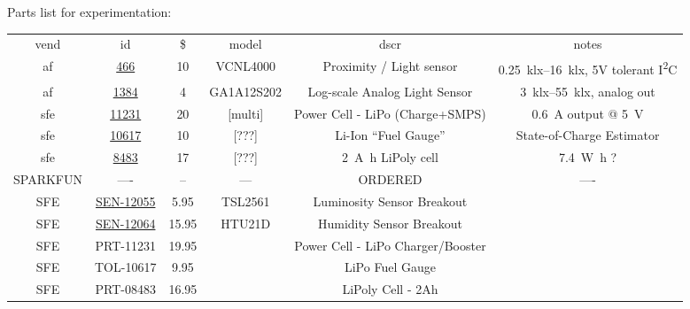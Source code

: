 \documentclass[12pt]{article} %
\begin{document}
Parts list for experimentation:
\\
\begin{tabu}{cccccc}
vend & id & \$ & model & dscr & notes
\\ af & \href{https://www.adafruit.com/products/466}{466}
    & 10 & VCNL4000 & Proximity / Light sensor
	& \SIrange{0.25}{16}{\kilo \lux},
	5V tolerant I\textsuperscript{2}C
\\ af & \href{https://www.adafruit.com/products/1384}{1384}
    & 4 & GA1A12S202 & Log-scale Analog Light Sensor
	& \SIrange{3}{55}{\kilo \lux}, 
	analog out
\\ sfe & \href{https://www.sparkfun.com/products/11231}{11231}
    & 20 & [multi] & Power Cell - LiPo (Charge+SMPS)
	& \SI{0.6}{\ampere} output @ \SI{5}{\volt}
\\ sfe & \href{https://www.sparkfun.com/products/10617}{10617}
    & 10 & [???] & Li-Ion ``Fuel Gauge'' 
	& State-of-Charge Estimator
\\ sfe & \href{https://www.sparkfun.com/products/8483}{8483}
    & 17 & [???] & \SI{2}{\ampere\hour} LiPoly cell
	& \SI{7.4}{\watt\hour} ?
\\ \hline SPARKFUN & ----
    & -- & --- & ORDERED
	& ----
\\ SFE & \href{https://www.sparkfun.com/products/12055}{SEN-12055}
	& 5.95 & TSL2561 & Luminosity Sensor Breakout &
\\ SFE & \href{https://www.sparkfun.com/products/12064}{SEN-12064}
	& 15.95 & HTU21D & Humidity Sensor Breakout &
\\ SFE & PRT-11231 
	& 19.95 && Power Cell - LiPo Charger/Booster &
\\ SFE & TOL-10617 
	& 9.95 && LiPo Fuel Gauge &
\\ SFE & PRT-08483 
	& 16.95 && LiPoly Cell - 2Ah &
\end{tabu}
\end{document}
